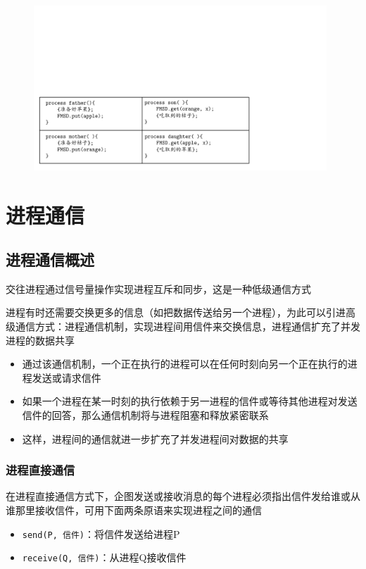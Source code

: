 \documentclass[cs4size,a4paper,10pt]{ctexart}
\begin{document}
	\begin{figure}[H]
		\centering
		\includegraphics[width=0.98\textwidth]{img/霍尔管程求解苹果桔子问题2.pdf}
	\end{figure}

	\section{进程通信}
	\subsection{进程通信概述}
	交往进程通过信号量操作实现进程互斥和同步，这是一种低级通信方式

	进程有时还需要交换更多的信息（如把数据传送给另一个进程），为此可以引进高级通信方式：进程通信机制，实现进程间用信件来交换信息，进程通信扩充了并发进程的数据共享
	\begin{itemize}
		\item 通过该通信机制，一个正在执行的进程可以在任何时刻向另一个正在执行的进程发送或请求信件
		\item 如果一个进程在某一时刻的执行依赖于另一进程的信件或等待其他进程对发送信件的回答，那么通信机制将与进程阻塞和释放紧密联系
		\item 这样，进程间的通信就进一步扩充了并发进程间对数据的共享
	\end{itemize}


	\subsubsection{进程直接通信}
	在进程直接通信方式下，企图发送或接收消息的每个进程必须指出信件发给谁或从谁那里接收信件，可用下面两条原语来实现进程之间的通信
	\begin{itemize}
		\item \verb|send(P, 信件)|：将信件发送给进程P
		\item \verb|receive(Q, 信件)|：从进程Q接收信件
	\end{itemize}
\end{document}
